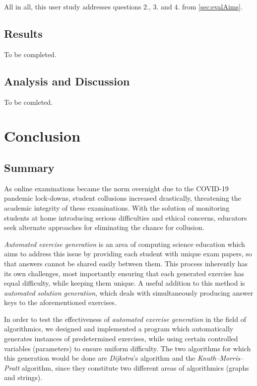 \documentclass{l4proj}
\begin{document}
All in all, this user study addresses questions $2.$, $3.$ and $4.$ from \autoref{sec:evalAims}.

\section{Results}

To be completed.

\section{Analysis and Discussion}

To be comleted.

\label{sec:analyis}

\chapter{Conclusion}    
\section{Summary}

As online examinations became the norm overnight due to the COVID-19 pandemic lock-downs, student collusions increased drastically, threatening the academic integrity of these examinations. With the solution of monitoring students at home introducing serious difficulties and ethical concerns, educators seek alternate approaches for eliminating the chance for collusion.

\emph{Automated exercise generation} is an area of computing science education which aims to address this issue by providing each student with unique exam papers, so that answers cannot be shared easily between them. This process inherently has its own challenges, most importantly ensuring that each generated exercise has equal difficulty, while keeping them unique. A useful addition to this method is \emph{automated solution generation}, which deals with simultaneously producing answer keys to the aforementioned exercises.

In order to test the effectiveness of \emph{automated exercise generation} in the field of algorithmics, we designed and implemented a program which automatically generates instances of predetermined exercises, while using certain controlled variables (parameters) to ensure uniform difficulty. The two algorithms for which this generation would be done are \emph{Dijkstra}'s algorithm and the \emph{Knuth–Morris–Pratt} algorithm, since they constitute two different areas of algorithmics (graphs and strings).
\end{document}
